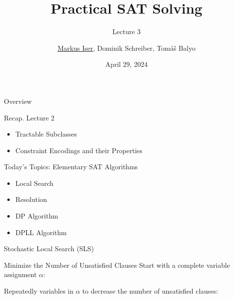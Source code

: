 \documentclass[t]{sdqbeamer}
\title[SAT Solving]{Practical SAT Solving}
\subtitle{Lecture 3}
\author{\underline{Markus Iser}, Dominik Schreiber, Tom\'a\v{s} Balyo}
\date{April 29, 2024}
\begin{document}
\begin{frame}
	\thispagestyle{empty}
	\titlepage
\end{frame}

\begin{frame}{Overview}
	\begin{block}{Recap. Lecture 2}
		\begin{itemize}\setlength{\itemsep}{1ex}
			\item Tractable Subclasses
			\item Constraint Encodings and their Properties
		\end{itemize}
	\end{block}
	\pause
	\begin{block}{Today's Topics: Elementary SAT Algorithms}
		\begin{itemize}\setlength{\itemsep}{1ex}
			\item Local Search
			\item Resolution
			\item DP Algorithm
			\item DPLL Algorithm
		\end{itemize}
	\end{block}
\end{frame}

\begin{frame}{Stochastic Local Search (SLS)}
\begin{block}{Minimize the Number of Unsatisfied Clauses}
	Start with a  complete variable assignment $\alpha$:
	\begin{center}
	\end{center}
	Repeatedly  variables in $\alpha$ to decrease the number of unsatisfied clauses:
	\begin{center}
	\end{center}
\end{block}
\end{frame}
	
\end{document}
